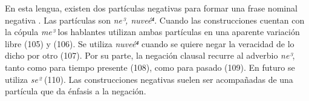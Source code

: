 En esta lengua, existen dos partículas negativas para formar una frase nominal negativa \textcolor{MidnightBlue}{\citep{Triqui}}. Las partículas son {\setmainfont{Charis SIL} \textit{ne³, nuveé⁴}}. Cuando las construcciones cuentan con la cópula {\setmainfont{Charis SIL} \textit{me³}} los hablantes utilizan ambas partículas en una aparente variación libre (105) y (106). Se utiliza {\setmainfont{Charis SIL} \textit{nuveé⁴}} cuando se quiere negar la veracidad de lo dicho por otro (107). Por su parte, la negación clausal recurre al adverbio {\setmainfont{Charis SIL} \textit{ne³}}, tanto como para tiempo presente (108), como para pasado (109). En futuro se utiliza {\setmainfont{Charis SIL} \textit{se²}} (110). Las construcciones negativas suelen ser acompañadas de una partícula que da énfasis a la negación.